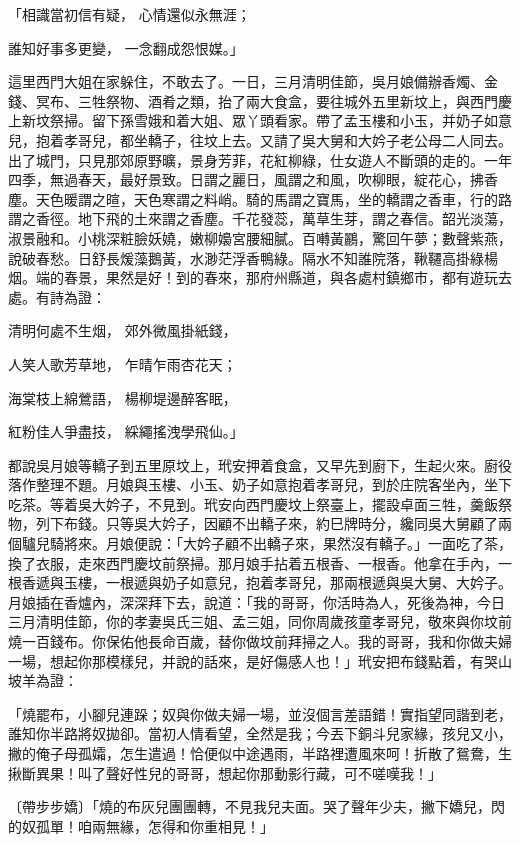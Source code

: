 \begin{showcontents}{}
「相識當初信有疑，  心情還似永無涯；

誰知好事多更變，  一念翻成怨恨媒。」

這里西門大姐在家躲住，不敢去了。一日，三月清明佳節，吳月娘備辦香燭、金錢、冥布、三牲祭物、酒肴之類，抬了兩大食盒，要往城外五里新坟上，與西門慶上新坟祭掃。留下孫雪娥和着大姐、眾丫頭看家。帶了孟玉樓和小玉，并奶子如意兒，抱着孝哥兒，都坐轎子，往坟上去。又請了吳大舅和大妗子老公母二人同去。出了城門，只見那郊原野曠，景身芳菲，花紅柳綠，仕女遊人不斷頭的走的。一年四季，無過春天，最好景致。日謂之麗日，風謂之和風，吹柳眼，綻花心，拂香塵。天色暖謂之暄，天色寒謂之料峭。騎的馬謂之寶馬，坐的轎謂之香車，行的路謂之香徑。地下飛的土來謂之香塵。千花發蕊，萬草生芽，謂之春信。韶光淡蕩，淑景融和。小桃深粧臉妖嬈，嫩柳嬝宮腰細膩。百囀黃鸝，驚回午夢；數聲紫燕，說破春愁。日舒長煖藻鵝黃，水渺茫浮香鴨綠。隔水不知誰院落，鞦韆高掛綠楊烟。端的春景，果然是好！到的春來，那府州縣道，與各處村鎮鄉市，都有遊玩去處。有詩為證：

清明何處不生烟，  郊外微風掛紙錢，

人笑人歌芳草地，  乍晴乍雨杏花天；

海棠枝上綿鶯語，  楊柳堤邊醉客眠，

紅粉佳人爭盡技，  綵繩搖洩學飛仙。」

都說吳月娘等轎子到五里原坟上，玳安押着食盒，又早先到廚下，生起火來。廚役落作整理不題。月娘與玉樓、小玉、奶子如意抱着孝哥兒，到於庄院客坐內，坐下吃茶。等着吳大妗子，不見到。玳安向西門慶坟上祭臺上，擺設卓面三牲，羹飯祭物，列下布錢。只等吳大妗子，因顧不出轎子來，約巳牌時分，纔同吳大舅顧了兩個驢兒騎將來。月娘便說：「大妗子顧不出轎子來，果然沒有轎子。」一面吃了茶，換了衣服，走來西門慶坟前祭掃。那月娘手拈着五根香、一根香。他拿在手內，一根香遞與玉樓，一根遞與奶子如意兒，抱着孝哥兒，那兩根遞與吳大舅、大妗子。月娘插在香爐內，深深拜下去，說道：「我的哥哥，你活時為人，死後為神，今日三月清明佳節，你的孝妻吳氏三姐、孟三姐，同你周歲孩童孝哥兒，敬來與你坟前燒一百錢布。你保佑他長命百歲，替你做坟前拜掃之人。我的哥哥，我和你做夫婦一場，想起你那模樣兒，并說的話來，是好傷感人也！」玳安把布錢點着，有哭山坡羊為證：

「燒罷布，小腳兒連跺；奴與你做夫婦一場，並沒個言差語錯！實指望同諧到老，誰知你半路將奴拋卻。當初人情看望，全然是我；今丟下銅斗兒家緣，孩兒又小，撇的俺子母孤孀，怎生遣過！恰便似中途遇雨，半路裡遭風來呵！折散了鴛鴦，生揪斷異果！叫了聲好性兒的哥哥，想起你那動影行藏，可不嗟嘆我！」

〔帶步步嬌〕「燒的布灰兒團團轉，不見我兒夫面。哭了聲年少夫，撇下嬌兒，閃的奴孤單！咱兩無緣，怎得和你重相見！」


\end{showcontents}
